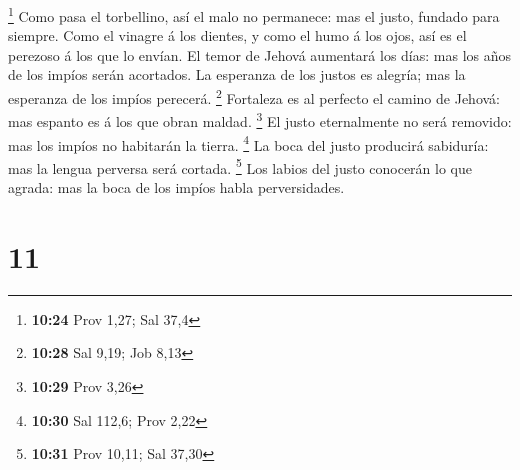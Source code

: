 \footnote{\textbf{10:24} Prov 1,27; Sal 37,4}  Como pasa
el torbellino, así el malo no permanece: mas el justo, fundado para
siempre.  Como el vinagre á los dientes, y como el humo á
los ojos, así es el perezoso á los que lo envían.  El
temor de Jehová aumentará los días: mas los años de los impíos serán
acortados.  La esperanza de los justos es alegría; mas la
esperanza de los impíos perecerá. \footnote{\textbf{10:28} Sal 9,19; Job
  8,13}  Fortaleza es al perfecto el camino de Jehová:
mas espanto es á los que obran maldad. \footnote{\textbf{10:29} Prov
  3,26}  El justo eternalmente no será removido: mas los
impíos no habitarán la tierra. \footnote{\textbf{10:30} Sal 112,6; Prov
  2,22}  La boca del justo producirá sabiduría: mas la
lengua perversa será cortada. \footnote{\textbf{10:31} Prov 10,11; Sal
  37,30}  Los labios del justo conocerán lo que agrada:
mas la boca de los impíos habla perversidades.

\hypertarget{section-10}{%
\section{11}\label{section-10}}

